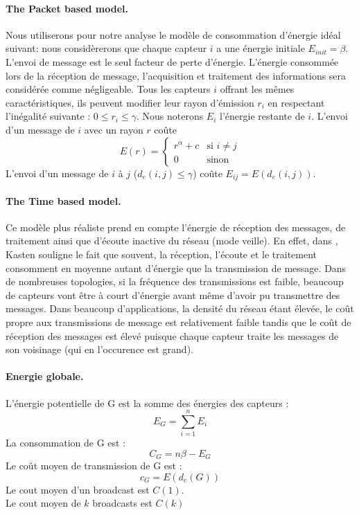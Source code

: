 \paragraph{The Packet based model.}
Nous utiliserons pour notre analyse le modèle de consommation d'énergie idéal suivant:
nous considèrerons que chaque capteur $i$ a une énergie initiale $E_{init}=\beta$.
L'envoi de message est le seul facteur de perte d'énergie. L'énergie consommée lors de la réception de message, l'acquisition et traitement des informations sera considérée comme négligeable.
Tous les capteurs $i$ offrant les mêmes caractéristiques, ils peuvent modifier leur rayon d'émission $r_i$ en respectant l'inégalité suivante : $0 \leq r_i \leq \gamma$.
Nous noterons $E_i$ l'énergie restante de $i$.
L'envoi d'un message de $i$ avec un rayon $r$ coûte $$ E(r)= \begin{cases} r^\alpha + c & \text{si }i\neq j \\ 0 & \text{sinon}  \end{cases}$$
L'envoi d'un message de $i$ à $j$ ($d_e(i,j)\leq \gamma$) coûte  $ E_{ij}=E(d_e(i,j))$.

\paragraph{The Time based model.}
Ce modèle plus réaliste prend en compte l'énergie de réception des messages, de traitement ainsi que d'écoute inactive du réseau (mode veille).
En effet, dans \cite{Kasten2001}, Kasten souligne le fait que souvent, la réception, l'écoute et le traitement consomment en moyenne autant d'énergie que la transmission de message.
Dans de nombreuses topologies, si la fréquence des transmissions est faible, beaucoup de capteurs vont être à court d'énergie avant même d'avoir pu transmettre des messages.
Dans beaucoup d'applications, la densité du réseau étant élevée, le coût propre aux transmissions de message est relativement faible tandis que le coût de réception des messages est élevé puisque chaque capteur traite les messages de son voisinage (qui en l'occurence est grand).



\paragraph{Energie globale.}
\begin{mydef}
 L'énergie potentielle de G est la somme des énergies des capteurs :$$E_G=\sum_{i=1}^n{E_i}$$
 La consommation de  G est :$$C_G=n\beta - E_G$$
 Le coût moyen de transmission de  G est :$$c_G=E(d_e(G))$$
 Le cout moyen d'un broadcast est $C(1)$.\\
 Le cout moyen de $k$ broadcasts est $C(k)$
\end{mydef}


